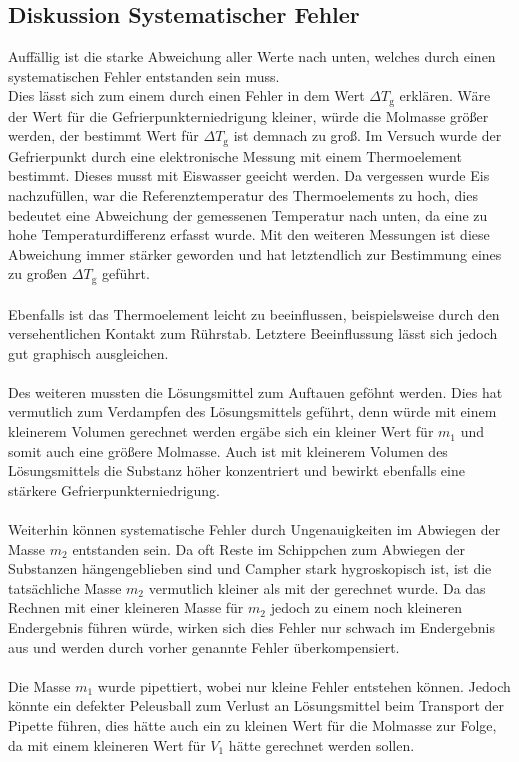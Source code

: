 \documentclass[12pt,a4paper,titlepage,headinclude,bibtotoc]{scrartcl}
\begin{document}
\subsection{Diskussion Systematischer Fehler}
Auffällig ist die starke Abweichung aller Werte nach unten, welches durch einen systematischen Fehler entstanden sein muss.\\
Dies lässt sich zum einem durch einen Fehler in dem Wert $\Delta T_\mathrm{g}$ erklären. Wäre der Wert für die Gefrierpunkterniedrigung kleiner, würde die Molmasse größer werden, der bestimmt Wert für $\Delta T_\mathrm{g}$ ist demnach zu groß. Im Versuch wurde der Gefrierpunkt durch eine elektronische Messung mit einem Thermoelement bestimmt. Dieses musst mit Eiswasser geeicht werden. Da vergessen wurde Eis nachzufüllen, war die Referenztemperatur des Thermoelements zu hoch, dies bedeutet eine Abweichung der gemessenen Temperatur nach unten, da eine zu hohe Temperaturdifferenz erfasst wurde.  Mit den weiteren Messungen ist diese Abweichung immer stärker geworden und  hat letztendlich zur Bestimmung eines zu großen $\Delta T_\mathrm{g}$ geführt.\\\\ 
Ebenfalls ist das Thermoelement leicht zu beeinflussen, beispielsweise durch den versehentlichen Kontakt zum Rührstab. Letztere Beeinflussung lässt sich jedoch gut graphisch ausgleichen.\\\\
Des weiteren mussten die Lösungsmittel zum Auftauen geföhnt werden. Dies hat vermutlich zum Verdampfen des Lösungsmittels geführt, denn würde mit einem kleinerem Volumen gerechnet werden ergäbe sich ein kleiner Wert für $m_1$ und somit auch eine größere Molmasse. Auch ist mit kleinerem Volumen des Lösungsmittels die Substanz höher konzentriert und bewirkt ebenfalls eine stärkere Gefrierpunkterniedrigung.\\\\
Weiterhin können systematische Fehler durch Ungenauigkeiten im Abwiegen der Masse $m_2$ entstanden sein. Da oft Reste im Schippchen zum Abwiegen der Substanzen hängengeblieben sind und Campher stark hygroskopisch ist, ist die tatsächliche Masse $m_2$ vermutlich kleiner als mit der gerechnet wurde. Da das Rechnen mit einer kleineren Masse für $m_2$ jedoch zu einem noch kleineren Endergebnis führen würde, wirken sich dies Fehler nur schwach im Endergebnis aus und werden durch vorher genannte Fehler überkompensiert.\\\\
Die Masse $m_1$ wurde pipettiert, wobei nur kleine Fehler entstehen können. Jedoch könnte ein defekter Peleusball zum Verlust an Lösungsmittel beim Transport der Pipette führen, dies hätte auch ein zu kleinen Wert für die Molmasse zur Folge, da mit einem kleineren Wert für $V_1$ hätte gerechnet werden sollen. \\\\  
\end{document}
